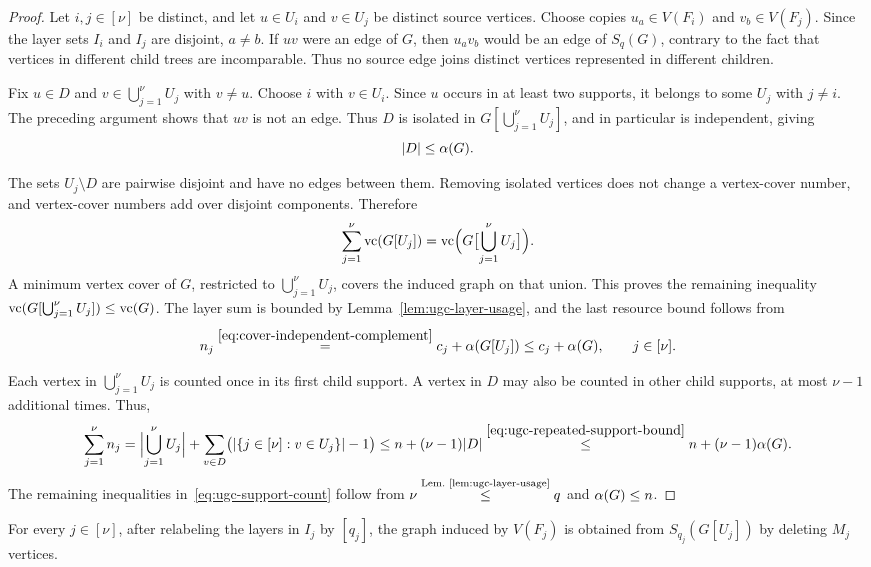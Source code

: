 \begin{proof}
Let $i,j\in[\nu]$ be distinct, and let $u\in U_i$ and $v\in U_j$
be distinct source vertices. Choose copies $u_a\in V(F_i)$ and $v_b\in V(F_j)$. Since the
layer sets $I_i$ and $I_j$ are disjoint, $a\ne b$. If $uv$ were an
edge of $G$, then $u_av_b$ would be an edge of $S_q(G)$, contrary to
the fact that vertices in different child trees are incomparable.
Thus no source edge joins distinct vertices represented in different
children.

Fix $u\in D$ and $v\in\bigcup_{j=1}^{\nu} U_j$ with $v\ne u$. Choose $i$ with
$v\in U_i$. Since $u$ occurs in at least two supports, it belongs to
some $U_j$ with $j\ne i$. The preceding argument shows that $uv$ is
not an edge. Thus $D$ is isolated in $G[\bigcup_{j=1}^{\nu} U_j]$, and in
particular is independent, giving
\begin{equation}\label{eq:ugc-repeated-support-bound}
 |D|\leq\alpha(G).
\end{equation}

The sets $U_j\setminus D$ are pairwise disjoint and have no edges
between them. Removing isolated vertices does not change a
vertex-cover number, and vertex-cover numbers add over disjoint
components. Therefore
\[
 \sum_{j=1}^{\nu} \operatorname{vc}(G[U_j])
 =\operatorname{vc}\Bigl(G\bigl[\bigcup_{j=1}^{\nu} U_j\bigr]\Bigr).
\]
A minimum vertex cover of $G$, restricted to $\bigcup_{j=1}^{\nu} U_j$, covers
the induced graph on that union. This proves the remaining inequality
$\operatorname{vc}(G[\bigcup_{j=1}^{\nu} U_j])\leq\operatorname{vc}(G)$.
The layer sum is bounded by Lemma~\ref{lem:ugc-layer-usage}, and
the last resource bound follows from
\[
 n_j\overset{\eqref{eq:cover-independent-complement}}{=}
 c_j+\alpha(G[U_j])\leq c_j+\alpha(G),
 \qquad j\in[\nu].
\]

Each vertex in $\bigcup_{j=1}^{\nu} U_j$ is counted once in its first child
support. A vertex in $D$ may also be counted in other child supports,
at most $\nu-1$ additional times. Thus,
\[
\sum_{j=1}^{\nu} n_j
 =\Bigl|\bigcup_{j=1}^{\nu} U_j\Bigr|
   +\sum_{v\in D}\bigl(|\{j\in[\nu]:v\in U_j\}|-1\bigr) \leq n+(\nu-1)|D|
 \overset{\eqref{eq:ugc-repeated-support-bound}}{\leq}
 n+(\nu-1)\alpha(G).
\]
The remaining inequalities in~\eqref{eq:ugc-support-count} follow
from $\nu\overset{\text{Lem.~\ref{lem:ugc-layer-usage}}}{\leq}q$
and $\alpha(G)\leq n$.
\end{proof}

\begin{lemma}
\label{lem:ugc-child-restriction}
For every $j\in[\nu]$, after relabeling the layers in $I_j$ by $[q_j]$, the graph induced by
$V(F_j)$ is obtained from $S_{q_j}(G[U_j])$ by deleting $M_j$
vertices.
\end{lemma}

